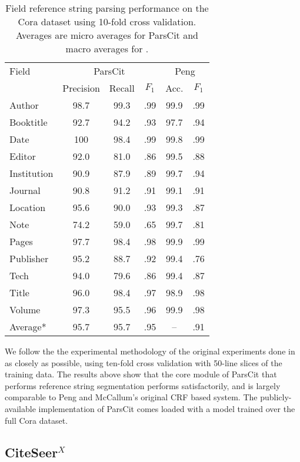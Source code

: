 \documentclass[10pt, a4paper]{article}
\begin{document}
\begin{table}[htb]
\centering
\begin{tabular}{|l|c|c|c|c|c|}
\hline
Field & \multicolumn{3}{|c|}{ParsCit} & \multicolumn{2}{|c|}{Peng} \\
& Precision & Recall & $F_1$ & Acc. & $F_1$ \\ 
\hline
Author 		& 98.7 & 99.3 & .99 	& 99.9 & .99 \\
Booktitle 	& 92.7 & 94.2 & .93	& 97.7 & .94 \\
Date 		& 100 & 98.4 & .99	& 99.8 & .99 \\
Editor 		& 92.0 & 81.0 & .86	& 99.5 & .88 \\
Institution 	& 90.9 & 87.9 & .89 	& 99.7 & .94 \\
Journal 	& 90.8 & 91.2 & .91 	& 99.1 & .91 \\
Location 	& 95.6 & 90.0 & .93	& 99.3 & .87 \\
Note 		& 74.2 & 59.0 & .65	& 99.7 & .81 \\
Pages 		& 97.7 & 98.4 & .98 	& 99.9 & .99 \\
Publisher 	& 95.2 & 88.7 & .92 	& 99.4 & .76 \\
Tech 		& 94.0 & 79.6 & .86 	& 99.4 & .87 \\
Title 		& 96.0 & 98.4 & .97 	& 98.9 & .98 \\
Volume 		& 97.3 & 95.5 & .96 	& 99.9 & .98 \\
\hline
Average* 	& 95.7 & 95.7 & .95	& -- & .91\\
\hline
\end{tabular}
\caption{Field reference string parsing performance on the Cora dataset using 10-fold cross validation.  Averages are micro averages for ParsCit and macro averages for \cite{peng04accurate}.}
\label{t:eval-cora}
\end{table}

We follow the the experimental methodology of the original experiments
done in \cite{peng04accurate} as closely as possible, using ten-fold
cross validation with 50-line slices of the training data. The results
above show that the core module of ParsCit that performs reference
string segmentation performs satisfactorily, and is largely comparable to
Peng and McCallum's original CRF based system.  The publicly-available
implementation of ParsCit comes loaded with a model trained over the
full Cora dataset.

\subsection{CiteSeer$^X$}
\end{document}
